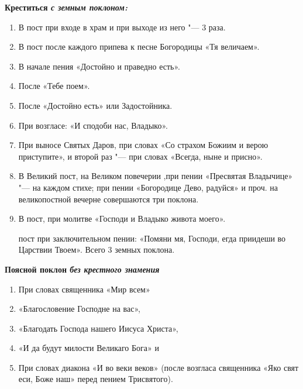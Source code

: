 \bfseries Креститься \itshape с земным поклоном: \normalfont{}

\begin{enumerate}
\item В пост при входе в храм и при выходе из него "--- 3 раза. 

\item В пост после каждого припева к песне Богородицы «Тя величаем». 

\item В начале пения «Достойно и праведно есть». 

\item После «Тебе поем». 

\item После «Достойно есть» или Задостойника. 

\item При возгласе: «И сподоби нас, Владыко». 

\item При выносе Святых Даров, при словах «Со страхом Божиим и верою приступите», и второй раз "--- при словах «Всегда, ныне и присно». 

\item В Великий пост, на Великом повечерии ,при пении «Пресвятая Владычице» "--- на каждом стихе; при пении «Богородице Дево, радуйся» и проч. на великопостной вечерне совершаются три поклона. 

\item В пост, при молитве «Господи и Владыко живота моего». 

 пост при заключительном пении: «Помяни мя, Господи, егда приидеши во Царствии Твоем». Всего 3 земных поклона.

\end{enumerate}





\bfseries Поясной поклон \itshape без крестного знамения \normalfont{}

\begin{enumerate}

\item При словах священника «Мир всем»

\item «Благословение Господне на вас»,





\item «Благодать Господа нашего Иисуса Христа», 

\item «И да будут милости Великаго Бога» и

\item При словах диакона «И во веки веков» (после возгласа священника «Яко свят еси, Боже наш» перед пением Трисвятого). 


\end{enumerate}





